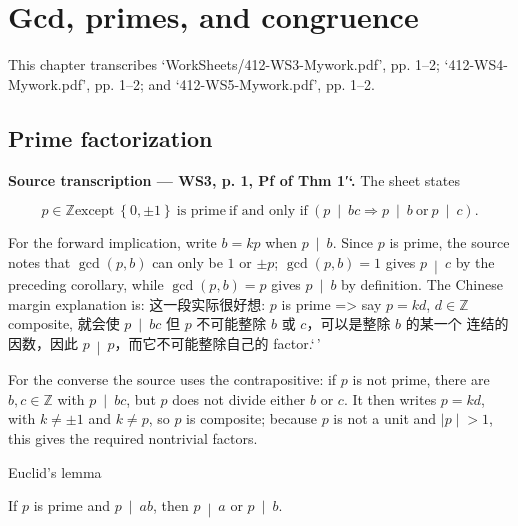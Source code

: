 \chapter{Gcd, primes, and congruence}\label{gcd-primes-and-congruence}

This chapter transcribes `WorkSheets/412-WS3-Mywork.pdf', pp. 1--2; `412-WS4-Mywork.pdf', pp. 1--2; and `412-WS5-Mywork.pdf', pp. 1--2.

\section{Prime factorization}

\textbf{Source transcription --- WS3, p. 1, Pf of Thm 1′`.} The sheet states

\[p \in \mathbb{Z}\text{except}\ \left\{ {0, \pm 1} \right\}\ \text{is prime}\ \text{if and only if}\ \left( p\  \middle| \ bc\Rightarrow p\  \middle| \ b\ \text{or}\ p\  \middle| \ c \right).\]

For the forward implication, write \(b = kp\) when \(\left. p\  \middle| \ b \right.\). Since \(p\) is prime, the source notes that \(\gcd\left( {p,b} \right)\) can only be \(1\) or \(\pm p\); \(\gcd\left( {p,b} \right) = 1\) gives \(\left. p\  \middle| \ c \right.\) by the preceding corollary, while \(\gcd\left( {p,b} \right) = p\) gives \(\left. p\  \middle| \ b \right.\) by definition. The Chinese margin explanation is: 这一段实际很好想: \(p\) is prime =\textgreater{} say \(p = kd\), \(d \in \mathbb{Z}\) composite, 就会使 \(\left. p\  \middle| \ bc \right.\) 但 \(p\) 不可能整除 \(b\) 或 \(c\)，可以是整除 \(b\) 的某一个 连结的因数，因此 \(\left. p\  \middle| \ p \right.\)，而它不可能整除自己的 factor.`\,'

For the converse the source uses the contrapositive: if \(p\) is not prime, there are \(b,c \in \mathbb{Z}\) with \(\left. p\  \middle| \ bc \right.\), but \(p\) does not divide either \(b\) or \(c\). It then writes \(p = kd\), with \(k \neq \pm 1\) and \(k \neq p\), so \(p\) is composite; because \(p\) is not a unit and \(\left. |p \middle| > 1 \right.\), this gives the required nontrivial factors.

\begin{theorem}{Euclid's lemma}

If \(p\) is prime and \(\left. p\  \middle| \ ab \right.\), then \(\left. p\  \middle| \ a \right.\) or \(\left. p\  \middle| \ b \right.\).

\end{theorem}

